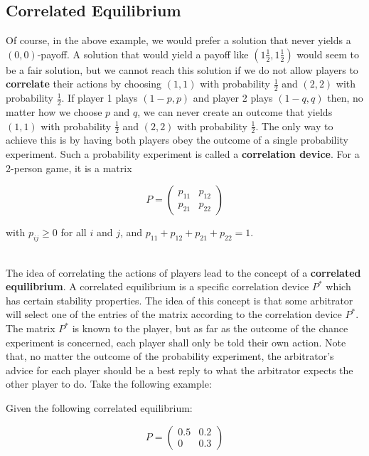 \documentclass[12pt]{article}
\begin{document}
\subsection{Correlated Equilibrium}
Of course, in the above example, we would prefer a solution that never yields a $(0, 0)$-payoff.
A solution that would yield a payoff like $\left( 1\frac{1}{2}, 1\frac{1}{2} \right)$ would seem to be a fair solution, but we cannot reach this solution if we do not allow players to \textbf{correlate} their actions by choosing $(1, 1)$ with probability $\frac{1}{2}$ and $(2, 2)$ with probability $\frac{1}{2}$.
If player 1 plays $(1 - p, p)$ and player 2 plays $(1 - q, q)$ then, no matter how we choose $p$ and $q$, we can never create an outcome that yields $(1, 1)$ with probability $\frac{1}{2}$ and $(2, 2)$ with probability $\frac{1}{2}$.
The only way to achieve this is by having both players obey the outcome of a single probability experiment.
Such a probability experiment is called a \textbf{correlation device}.
For a 2-person game, it is a matrix

\[ P = \begin{pmatrix}
    p_{11} & p_{12} \\
    p_{21} & p_{22}
\end{pmatrix} \]

\noindent
with $p_{ij} \geq 0$ for all $i$ and $j$, and $p_{11} + p_{12} + p_{21} + p_{22} = 1$.

\noindent
\\
The idea of correlating the actions of players lead to the concept of a \textbf{correlated equilibrium}.
A correlated equilibrium is a specific correlation device $P^*$ which has certain stability properties.
The idea of this concept is that some arbitrator will select one of the entries of the matrix according to the correlation device $P^*$.
The matrix $P^*$ is known to the player, but as far as the outcome of the chance experiment is concerned, each player shall only be told their own action.
Note that, no matter the outcome of the probability experiment, the arbitrator's advice for each player should be a best reply to what the arbitrator expects the other player to do.
Take the following example:

\newpage
\noindent
Given the following correlated equilibrium:

\[ P = \begin{pmatrix}
    0.5 & 0.2 \\
    0 & 0.3
\end{pmatrix} \]
\end{document}
